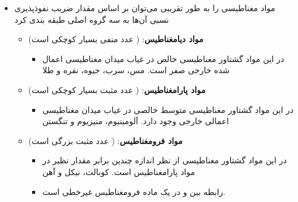 \begin{ELunit}

\begin{itemize}
\tightlist
\item
  مواد مغناطیسی را به طور تقریبی می‌توان بر اساس مقدار ضریب نفوذپذیری نسبی آن‌ها به سه گروه اصلی طبقه بندی کرد

  \begin{itemize}
  \tightlist
  \item
    \textbf{مواد دیامغناطیس}:  ( عدد منفی بسیار کوچکی است)

    \begin{itemize}
    \tightlist
    \item
      در این مواد گشتاور مغناطیسی خالص در غیاب میدان مغناطیسی اعمال شده خارجی صفر است. \ELim{\ELto} مس، سرب، جیوه، نقره و طلا \ELim{\ELto} 
    \end{itemize}
  \item
    \textbf{مواد پارامغناطیس}:  ( عدد مثبت بسیار کوچکی است)

    \begin{itemize}
    \tightlist
    \item
      در این مواد گشتاور مغناطیسی متوسط خالصی در غیاب میدان مغناطیسی اعمالی خارجی وجود دارد. \ELim{\ELto} آلومینیوم، منیزیوم و تنگستن \ELim{\ELto} 
    \end{itemize}
  \item
    \textbf{مواد فرومغناطیس}:  ( عدد مثبت بزرگی است)

    \begin{itemize}
    \tightlist
    \item
      در این مواد گشتاور مغناطیسی از نظر اندازه چندین برابر مقدار نظیر در مواد پارامغناطیس است. \ELim{\ELto} کوبالت، نیکل و آهن
    \item
      رابطه بین  و  در یک ماده فرومغناطیس غیرخطی است.
    \end{itemize}
  \end{itemize}
\end{itemize}


\end{ELunit}

\ELhold



